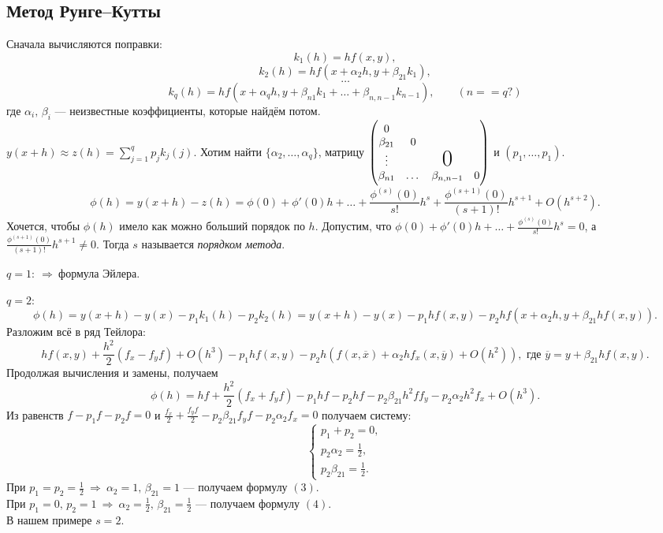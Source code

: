 \subsection{Метод Рунге--Кутты}
Сначала вычисляются поправки:
$$k_1(h) = hf(x, y),$$
$$k_2(h) = hf(x+\alpha_2h, y+\beta_{21}k_1),$$
$$\dots$$
$$k_q(h) = hf(x+\alpha_qh, y+\beta_{n1}k_1+\dots+\beta_{n,n-1}k_{n-1}), \qquad (n==q?)$$ %
где $\alpha_i, \, \beta_i$ --- неизвестные коэффициенты, которые найдём потом.\\
$y(x+h) \approx z(h)=\sum_{j=1}^q p_jk_j(j)$. Хотим найти $\{ \alpha_2, \dots, \alpha_q \}$, матрицу 
$\begin{pmatrix}
	0          &       &                \\
	\beta_{21} & 0     &               &\\
	\vdots     &       & \text{\huge0}  \\
	\beta_{n1} & \dots & \beta_{n,n-1} & 0
\end{pmatrix}$ 
и $\left( p_1, \dots, p_1 \right).$
$$\phi(h) = y(x+h) - z(h) = \phi(0) + \phi'(0)h + \dots + \frac{\phi^{(s)}(0)}{s!}h^s + \frac{\phi^{(s+1)}(0)}{(s+1)!}h^{s+1} + O(h^{s+2}).$$
Хочется, чтобы $\phi(h)$ имело как можно больший порядок по $h$. Допустим, что $\phi(0) + \phi'(0)h + \dots + \frac{\phi^{(s)}(0)}{s!}h^s = 0$, а $\frac{\phi^{(s+1)}(0)}{(s+1)!}h^{s+1} \neq 0$. Тогда $s$ называется \emph{порядком метода}.
\begin{ex} \label{ex2-1}
	$q=1: \ \Rightarrow \ \text{формула Эйлера.}$
\end{ex}
\begin{ex} \label{ex2-2}
	$q=2: $
	$$\phi(h) = y(x+h) - y(x) - p_1k_1(h) - p_2k_2(h) = y(x+h) - y(x) - p_1hf(x,y) - p_2hf(x+\alpha_2h, y+\beta_{21}hf(x,y)).$$
	Разложим всё в ряд Тейлора:
	$$hf(x,y) + \frac{h^2}{2}\left( f_x - f_yf \right) + O(h^3) - p_1hf(x,y) - p_2h\left(f(x,\overline{x})+\alpha_2hf_x(x,\overline{y})+O(h^2)\right), \text{ где } \overline{y} = y+\beta_{21}hf(x,y).$$
	Продолжая вычисления и замены, получаем
	$$\phi(h) = hf + \frac{h^2}{2}\left( f_x + f_yf \right) - p_1hf - p_2hf - p_2\beta_{21}h^2ff_y - p_2\alpha_2h^2f_x + O(h^3).$$
	Из равенств $f-p_1f-p_2f=0$ и $\frac{f_x}{2}+\frac{f_yf}{2}-p_2\beta_{21}f_yf-p_2\alpha_2f_x=0$ получаем систему:
	$$\begin{cases}
		p_1 + p_2 = 0, \\
		p_2\alpha_2 = \frac{1}{2}, \\
		p_2\beta_{21} = \frac{1}{2}.
	\end{cases}$$
	При $p_1=p_2=\frac{1}{2} \ \Rightarrow \ \alpha_2=1, \, \beta_{21}=1$ --- получаем формулу $(3)$.\\
	При $p_1=0, \, p_2=1 \ \Rightarrow \ \alpha_2=\frac{1}{2}, \, \beta_{21}=\frac{1}{2}$ --- получаем формулу $(4)$.\\
	В нашем примере $s=2$.
\end{ex}
